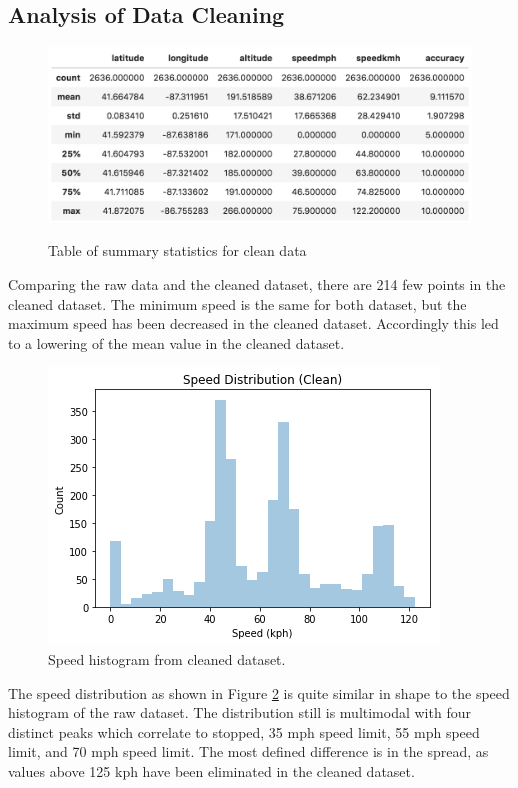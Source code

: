 \documentclass[12pt]{article}
\begin{document}
\subsection{Analysis of Data Cleaning}

\begin{figure}
	\centering
		\caption{Table of summary statistics for clean data}
	\includegraphics[scale= 0.8]{file1_clean_summary.png}
	\label{file1_clean_summary}
\end{figure}

Comparing the raw data and the cleaned dataset, there are 214 few points in the cleaned dataset. The minimum speed is the same for both dataset, but the maximum speed has been decreased in the cleaned dataset. Accordingly this led to a lowering of the mean value in the cleaned dataset. 

\begin{figure}
	\centering
	\includegraphics[scale= 0.8]{speed_hist_clean.png}
	\caption{Speed histogram from cleaned dataset.}
	\label{speed_hist_clean}
\end{figure}


The speed distribution as shown in Figure \ref{speed_hist_clean} is quite similar in shape to the speed histogram of the raw dataset. The distribution still is multimodal with four distinct peaks which correlate to stopped, 35 mph speed limit, 55 mph speed limit, and 70 mph speed limit. The most defined difference is in the spread, as values above 125 kph have been eliminated in the cleaned dataset. 
\end{document}
